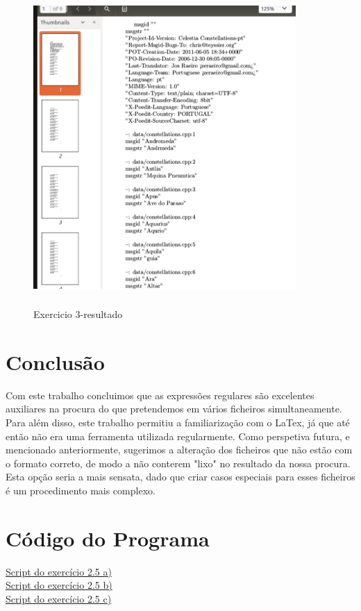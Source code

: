 \documentclass{report}
\begin{document}
\begin{figure}[h]
\centering
\includegraphics[width=10cm,height= 12cm]{exercicio32.png}
\caption{Exercicio 3-resultado}
\label{Exercicio 3}
\end{figure}


\chapter{Conclusão} \label{concl}
Com este trabalho concluimos que as expressões regulares são excelentes auxiliares na procura do que pretendemos em vários ficheiros simultaneamente.
Para além disso, este trabalho permitiu a familiarização com o LaTex, já que até então não era uma ferramenta utilizada regularmente.
Como perspetiva futura, e mencionado anteriormente, sugerimos a alteração dos ficheiros que não estão com o formato correto, de modo a não conterem "lixo" no resultado da nossa procura. Esta opção seria a mais sensata, dado que criar casos especiais para esses ficheiros é um procedimento mais complexo.



\chapter{Código do Programa}

\href{run:/home/user/Desktop/PLC/trabalhoP/ex/}{Script do exercício 2.5 a)}\\
\href{run:/home/user/Desktop/PLC/trabalhoP/ex2/}{Script do exercício 2.5 b)}\\
\href{run:/home/user/Desktop/PLC/trabalhoP/ex3/}{Script do exercício 2.5 c)}\\
\end{document}
